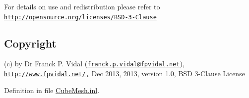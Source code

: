 For details on use and redistribution please refer to \href{http://opensource.org/licenses/BSD-3-Clause}{\tt http://opensource.org/licenses/BSD-\/3-\/Clause}\hypertarget{_x_ray_renderer_8inl_Copyright}{}\subsection{Copyright}\label{_x_ray_renderer_8inl_Copyright}
(c) by Dr Franck P. Vidal (\href{mailto:franck.p.vidal@fpvidal.net}{\tt franck.p.vidal@fpvidal.net}), \href{http://www.fpvidal.net/,}{\tt http://www.fpvidal.net/,} Dec 2013, 2013, version 1.0, BSD 3-\/Clause License 

Definition in file \hyperlink{_cube_mesh_8inl_source}{CubeMesh.inl}.

